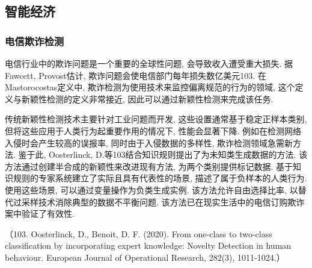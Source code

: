\documentclass{Style/aas}
\begin{document}
\begin{multicols}{2}
  \subsection{智能经济}
  \subsubsection{电信欺诈检测}
  电信行业中的欺诈问题是一个重要的全球性问题, 会导致收入遭受重大损失. 据Fawcett, Provost估计, 欺诈问题会使电信部门每年损失数亿美元103. 在Mastorocostas定义中, 欺诈检测为使用技术来监控偏离规范的行为的领域, 这个定义与新颖性检测的定义非常接近, 因此可以通过新颖性检测来完成该任务.

  传统新颖性检测技术主要针对工业问题而开发, 这些设置通常基于稳定正样本类别, 但将这些应用于人类行为起重要作用的情况下, 性能会显著下降. 例如在检测网络入侵时会产生较高的误报率, 同时由于入侵数据的多样性, 欺诈检测领域急需新方法. 鉴于此, Oosterlinck, D.等103结合知识规则提出了为未知类生成数据的方法. 该方法通过创建半合成的新颖性来改进现有方法, 为两个类别提供标记数据. 基于知识规则的专家系统建立了实际且具有代表性的场景, 描述了属于负样本的人类行为. 使用这些场景, 可以通过变量操作为负类生成实例. 该方法允许自由选择比率, 以替代过采样技术消除典型的数据不平衡问题. 该方法已在现实生活中的电信订购欺诈案中验证了有效性.

  （103.	Oosterlinck, D., Benoit, D. F. (2020). From one-class to two-class classification by incorporating expert knowledge: Novelty Detection in human behaviour. European Journal of Operational Research, 282(3), 1011-1024.）


\end{multicols}
\end{document}
